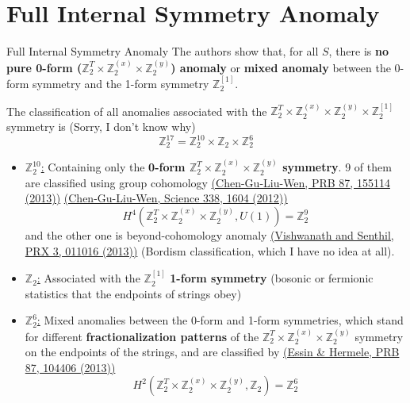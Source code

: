 \documentclass[professionalfont]{beamer}
\newcommand{\hereref}[2]{\href{#1}{{\tiny (#2)}}}
\begin{document}
\section{Full Internal Symmetry Anomaly}
\begin{frame}{Full Internal Symmetry Anomaly}
    The authors show that, for all $S$, there is \textbf{no pure 0-form ($\mathbb{Z}^T_2 \times \mathbb{Z}^{(x)}_2 \times \mathbb{Z}^{(y)}_2$) anomaly} or \textbf{mixed anomaly} between the 0-form symmetry and the 1-form symmetry $\mathbb{Z}_2^{[1]}$. 

    The classification of all anomalies associated with the $\mathbb{Z}^T_2 \times \mathbb{Z}^{(x)}_2 \times \mathbb{Z}^{(y)}_2 \times \mathbb{Z}_2^{[1]}$ symmetry is \alert{(Sorry, I don't know why)}
    \[
    \mathbb{Z}_2^{17} = \mathbb{Z}_2^{10} \times \mathbb{Z}_2 \times \mathbb{Z}_2^{6}
    \]
    \begin{itemize}
        \item \underline{$\mathbb{Z}_2^{10}$:} Containing only the \textbf{0-form $\mathbb{Z}^T_2 \times \mathbb{Z}^{(x)}_2 \times \mathbb{Z}^{(y)}_2$ symmetry}. 9 of them are classified using group cohomology \hereref{https://doi.org/10.1103/PhysRevB.87.155114}{Chen-Gu-Liu-Wen, PRB 87, 155114 (2013)} \hereref{https://doi.org/10.1126/science.1227224}{Chen-Gu-Liu-Wen, Science 338, 1604 (2012)}
        \[
        H^4(\mathbb{Z}^T_2 \times \mathbb{Z}^{(x)}_2 \times \mathbb{Z}^{(y)}_2, U(1)) = \mathbb{Z}_2^{9}
        \]
        and the other one is beyond-cohomology anomaly \hereref{https://doi.org/10.1103/PhysRevX.3.011016}{Vishwanath and Senthil, PRX 3, 011016 (2013)} \alert{(Bordism classification, which I have no idea at all)}.

        \item \underline{$\mathbb{Z}_2$:} Associated with the $\mathbb{Z}_2^{[1]}$ \textbf{1-form symmetry} (bosonic or fermionic statistics that the endpoints of strings obey)

        \item \underline{$\mathbb{Z}_2^6$:} Mixed anomalies between the 0-form and 1-form symmetries, which stand for different \textbf{fractionalization patterns} of the $\mathbb{Z}^T_2 \times \mathbb{Z}^{(x)}_2 \times \mathbb{Z}^{(y)}_2$ symmetry on the endpoints of the strings, and are classified by \hereref{https://doi.org/10.1103/PhysRevB.87.104406}{Essin \& Hermele, PRB 87, 104406 (2013)}
        \[
        H^2(\mathbb{Z}^T_2 \times \mathbb{Z}^{(x)}_2 \times \mathbb{Z}^{(y)}_2, \mathbb{Z}_2) = \mathbb{Z}_2^6
        \]
    \end{itemize}
\end{frame}
\end{document}
